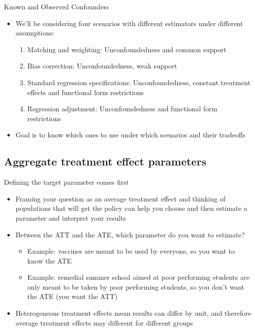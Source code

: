 \documentclass{beamer}
\begin{document}
\begin{frame}{Known and Observed Confounders}

\begin{itemize}
\item We'll be considering four scenarios with different estimators under different assumptions:
	\begin{enumerate}
	\item Matching and weighting: Unconfoundedness and common support
	\item Bias correction: Unconfoundedness, weak support
	\item Standard regression specifications: Unconfoundedness, constant treatment effects and functional form restrictions
	\item Regression adjustment: Unconfoundedness and functional form restrictions
	\end{enumerate}
\item Goal is to know which ones to use under which scenarios and their tradeoffs
\end{itemize}

\end{frame}



\subsection{Aggregate treatment effect parameters}


\begin{frame}{Defining the target parameter comes first}

\begin{itemize}
\item Framing your question as an average treatment effect and thinking of populations that will get the policy can help you choose and then estimate a parameter and interpret your results
\item Between the ATT and the ATE, which parameter do you want to estimate?  
	\begin{itemize}
	\item Example: vaccines are meant to be used by everyone, so you want to know the ATE
	\item Example: remedial summer school aimed at poor performing students are only meant to be taken by poor performing students, so you don't want the ATE (you want the ATT)
	\end{itemize}
\item Heterogeneous treatment effects mean results can differ by unit, and therefore average treatment effects may different for different groups 

\end{itemize}

\end{frame}
\end{document}
